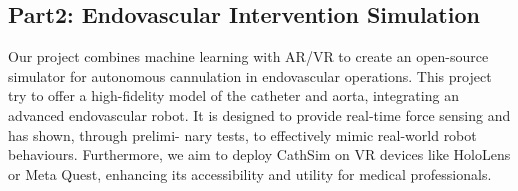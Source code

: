 \documentclass[12pt]{article}
\begin{document}
\subsection{Part2: Endovascular Intervention Simulation}
Our project combines machine learning with AR/VR \cite{9376657,Ranne2023AiAReSegCD} to create an open-source simulator for autonomous cannulation in endovascular operations. This project try to offer a high-fidelity model of the catheter
and aorta, integrating an advanced endovascular robot. It is designed to provide real-time force sensing and has shown, through prelimi-
nary tests, to effectively mimic real-world robot behaviours\cite{jianu2022cathsim}. Furthermore, we aim to deploy CathSim on VR devices like
HoloLens or Meta Quest\cite{Quest}, enhancing its accessibility and utility for medical professionals.
\end{document}
